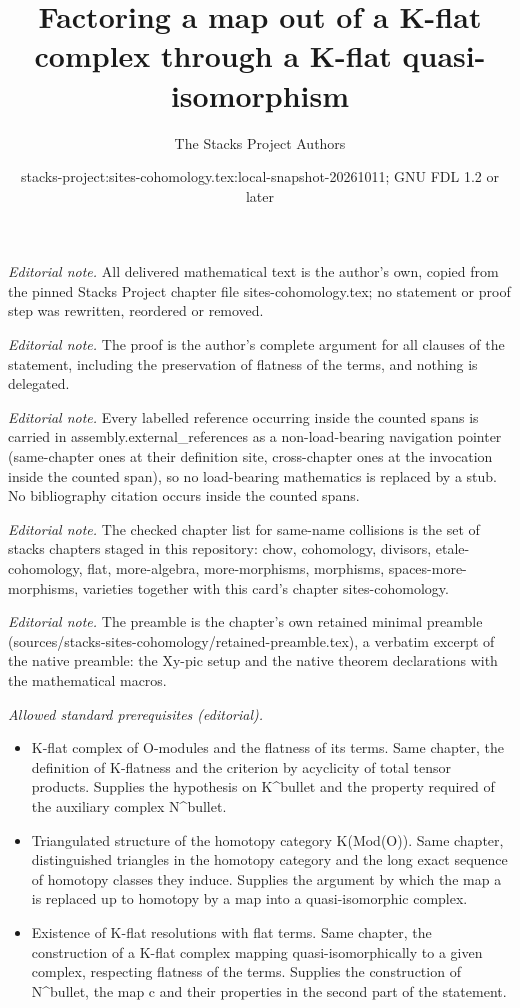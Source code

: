 \documentclass[10pt,a4paper]{amsart}
\title{Factoring a map out of a K-flat complex through a K-flat quasi-isomorphism}
\author{The Stacks Project Authors}
\date{stacks-project:sites-cohomology.tex:local-snapshot-20261011; GNU FDL 1.2 or later}
\theoremstyle{plain}
\theoremstyle{definition}
\theoremstyle{remark}
\numberwithin{equation}{subsection}
\begin{document}
\maketitle
\noindent\textit{Editorial note.} All delivered mathematical text is the author's own, copied from the pinned Stacks Project chapter file sites-cohomology.tex; no statement or proof step was rewritten, reordered or removed.\par\medskip
\noindent\textit{Editorial note.} The proof is the author's complete argument for all clauses of the statement, including the preservation of flatness of the terms, and nothing is delegated.\par\medskip
\noindent\textit{Editorial note.} Every labelled reference occurring inside the counted spans is carried in assembly.external\_references as a non-load-bearing navigation pointer (same-chapter ones at their definition site, cross-chapter ones at the invocation inside the counted span), so no load-bearing mathematics is replaced by a stub. No bibliography citation occurs inside the counted spans.\par\medskip
\noindent\textit{Editorial note.} The checked chapter list for same-name collisions is the set of stacks chapters staged in this repository: chow, cohomology, divisors, etale-cohomology, flat, more-algebra, more-morphisms, morphisms, spaces-more-morphisms, varieties together with this card's chapter sites-cohomology.\par\medskip
\noindent\textit{Editorial note.} The preamble is the chapter's own retained minimal preamble (sources/stacks-sites-cohomology/retained-preamble.tex), a verbatim excerpt of the native preamble: the Xy-pic setup and the native theorem declarations with the mathematical macros.\par\medskip
\noindent\textit{Allowed standard prerequisites (editorial).}\begin{itemize}
\item K-flat complex of O-modules and the flatness of its terms. Same chapter, the definition of K-flatness and the criterion by acyclicity of total tensor products. Supplies the hypothesis on K\textasciicircum{}bullet and the property required of the auxiliary complex N\textasciicircum{}bullet.
\item Triangulated structure of the homotopy category K(Mod(O)). Same chapter, distinguished triangles in the homotopy category and the long exact sequence of homotopy classes they induce. Supplies the argument by which the map a is replaced up to homotopy by a map into a quasi-isomorphic complex.
\item Existence of K-flat resolutions with flat terms. Same chapter, the construction of a K-flat complex mapping quasi-isomorphically to a given complex, respecting flatness of the terms. Supplies the construction of N\textasciicircum{}bullet, the map c and their properties in the second part of the statement.
\end{itemize}\medskip
\end{document}
